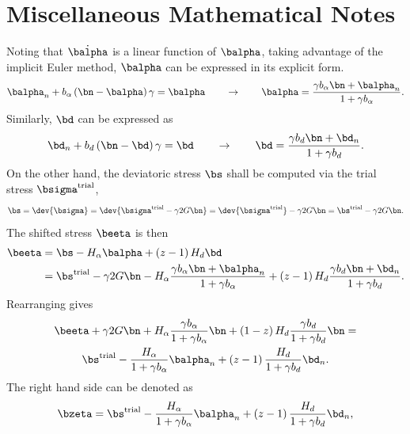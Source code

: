 \section{Miscellaneous Mathematical Notes}
Noting that $\dot{\balpha}$ is a linear function of $\balpha$, taking advantage of the implicit Euler method, $\balpha$ can be expressed in its explicit form.
\begin{gather}\label{eq:explicit_alpha}
    \balpha_n+b_\alpha\left(\bn-\balpha\right)\gamma=\balpha\qquad\rightarrow\qquad
    \balpha=\dfrac{\gamma{}b_\alpha\bn+\balpha_n}{1+\gamma{}b_\alpha}.
\end{gather}
Similarly, $\bd$ can be expressed as
\begin{gather}\label{eq:explicit_d}
    \bd_n+b_d\left(\bn-\bd\right)\gamma=\bd\qquad\rightarrow\qquad
    \bd=\dfrac{\gamma{}b_d\bn+\bd_n}{1+\gamma{}b_d}.
\end{gather}
On the other hand, the deviatoric stress $\bs$ shall be computed via the trial stress $\bsigma^\text{trial}$,
\begin{gather}
    \bs=\dev{\bsigma}=\dev{\bsigma^\text{trial}-\gamma2G\bn}=\dev{\bsigma^\text{trial}}-\gamma2G\bn=\bs^\text{trial}-\gamma2G\bn.
\end{gather}
The shifted stress $\beeta$ is then
\begin{gather}\label{eq:explicit_eta}
    \begin{split}
        \beeta & =\bs-H_\alpha\balpha+\left(z-1\right)H_d\bd                                                                                                                     \\
               & =\bs^\text{trial}-\gamma2G\bn-H_\alpha\dfrac{\gamma{}b_\alpha\bn+\balpha_n}{1+\gamma{}b_\alpha}+\left(z-1\right)H_d\dfrac{\gamma{}b_d\bn+\bd_n}{1+\gamma{}b_d}.
    \end{split}
\end{gather}
Rearranging gives
\begin{multline}
    \beeta+\gamma2G\bn+H_\alpha\dfrac{\gamma{}b_\alpha}{1+\gamma{}b_\alpha}\bn+\left(1-z\right)H_d\dfrac{\gamma{}b_d}{1+\gamma{}b_d}\bn=\\
    \bs^\text{trial}-\dfrac{H_\alpha}{1+\gamma{}b_\alpha}\balpha_n+\left(z-1\right)\dfrac{H_d}{1+\gamma{}b_d}\bd_n.
\end{multline}
The right hand side can be denoted as
\begin{gather}\label{eq:zeta}
    \bzeta=\bs^\text{trial}-\dfrac{H_\alpha}{1+\gamma{}b_\alpha}\balpha_n+\left(z-1\right)\dfrac{H_d}{1+\gamma{}b_d}\bd_n,
\end{gather}

